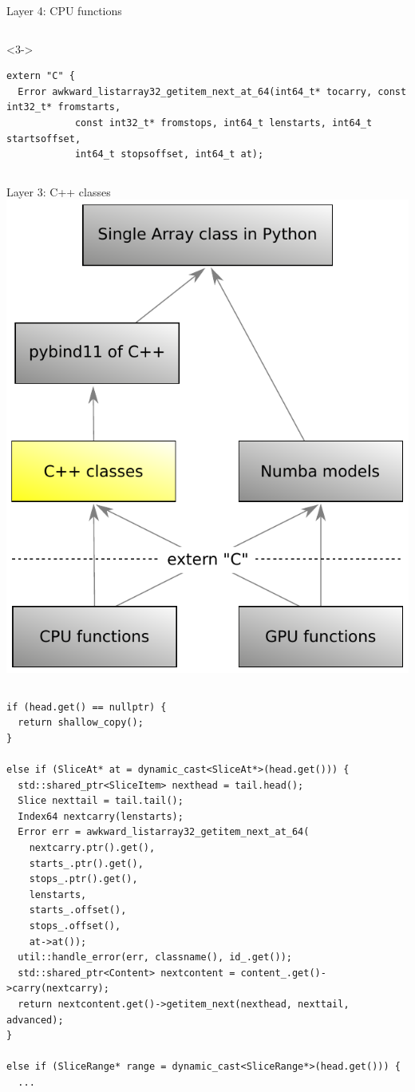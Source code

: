 \documentclass[aspectratio=169]{beamer}
\begin{document}
\begin{frame}[fragile]{Layer 4: CPU functions}
\begin{columns}
\vspace{-0.35 cm}
\begin{uncoverenv}<3->
\begin{verbatim}
extern "C" {
  Error awkward_listarray32_getitem_next_at_64(int64_t* tocarry, const int32_t* fromstarts,
            const int32_t* fromstops, int64_t lenstarts, int64_t startsoffset,
            int64_t stopsoffset, int64_t at);
\end{verbatim}
\end{uncoverenv}
\end{columns}
\vspace{1 cm}
\end{frame}

\begin{frame}[fragile]{Layer 3: C++ classes}
\vspace{0.5 cm}
\hfill\mbox{\includegraphics[height=4 cm]{awkward-1-0-layers-mini-cpp.pdf}\hspace{-0.75 cm}}

\scriptsize
\vspace{-4.45 cm}
\begin{columns}
\begin{verbatim}
if (head.get() == nullptr) {
  return shallow_copy();
}

else if (SliceAt* at = dynamic_cast<SliceAt*>(head.get())) {
  std::shared_ptr<SliceItem> nexthead = tail.head();
  Slice nexttail = tail.tail();
  Index64 nextcarry(lenstarts);
  Error err = awkward_listarray32_getitem_next_at_64(
    nextcarry.ptr().get(),
    starts_.ptr().get(),
    stops_.ptr().get(),
    lenstarts,
    starts_.offset(),
    stops_.offset(),
    at->at());
  util::handle_error(err, classname(), id_.get());
  std::shared_ptr<Content> nextcontent = content_.get()->carry(nextcarry);
  return nextcontent.get()->getitem_next(nexthead, nexttail, advanced);
}

else if (SliceRange* range = dynamic_cast<SliceRange*>(head.get())) {
  ...
\end{verbatim}
\end{columns}
\vspace{1 cm}
\end{frame}
\end{document}

